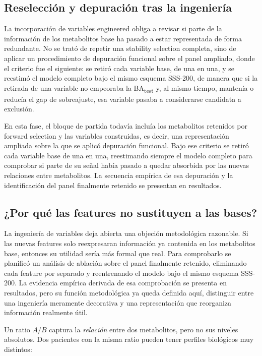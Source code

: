\subsection{Reselección y depuración tras la ingeniería}

La incorporación de variables engineered obliga a revisar si parte de la información de los metabolitos base ha pasado a
estar representada de forma redundante. No se trató de repetir una stability selection completa, sino de aplicar un
procedimiento de depuración funcional sobre el panel ampliado, donde el criterio fue el siguiente: se retiró cada variable base,
de una en una, y se reestimó el modelo completo bajo el mismo esquema SSS-200, de manera que si la retirada de una variable
 no empeoraba la BA\textsubscript{test} y, al mismo tiempo, mantenía o reducía el gap de sobreajuste, esa variable pasaba
 a considerarse candidata a exclusión.

En esta fase, el bloque de partida todavía incluía los metabolitos retenidos por forward selection y las variables
construidas, es decir, una representación ampliada sobre la que se aplicó depuración funcional. Bajo ese criterio se
retiró cada variable base de una en una, reestimando siempre el modelo completo para comprobar si parte de su señal había
pasado a quedar absorbida por las nuevas relaciones entre metabolitos. La secuencia empírica de esa depuración y la
identificación del panel finalmente retenido se presentan en resultados.

\subsection{¿Por qué las features no sustituyen a las bases?}

La ingeniería de variables deja abierta una objeción metodológica razonable. Si las nuevas features solo reexpresaran
información ya contenida en los metabolitos base, entonces su utilidad sería más formal que real. Para comprobarlo se
planificó un análisis de ablación sobre el panel finalmente retenido, eliminando cada feature por separado y reentrenando
el modelo bajo el mismo esquema SSS-200. La evidencia empírica derivada de esa comprobación se presenta en resultados,
pero su función metodológica ya queda definida aquí, distinguir entre una ingeniería meramente decorativa y una
representación que reorganiza información realmente útil.

Un ratio $A/B$ captura la \textit{relación} entre dos metabolitos, pero no sus niveles absolutos. Dos pacientes con la misma ratio pueden tener perfiles biológicos muy distintos:

